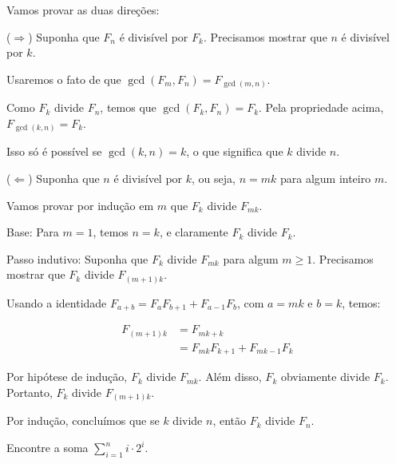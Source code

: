 \documentclass[12pt,a4paper]{article}
\begin{document}
\begin{tcolorbox}[colback=green!5!white,colframe=green!75!black,title=Resolução]
Vamos provar as duas direções:

($\Rightarrow$) Suponha que $F_n$ é divisível por $F_k$. Precisamos mostrar que $n$ é divisível por $k$.

Usaremos o fato de que $\gcd(F_m, F_n) = F_{\gcd(m,n)}$.

Como $F_k$ divide $F_n$, temos que $\gcd(F_k, F_n) = F_k$. Pela propriedade acima, $F_{\gcd(k,n)} = F_k$.

Isso só é possível se $\gcd(k,n) = k$, o que significa que $k$ divide $n$.

($\Leftarrow$) Suponha que $n$ é divisível por $k$, ou seja, $n = mk$ para algum inteiro $m$.

Vamos provar por indução em $m$ que $F_k$ divide $F_{mk}$.

Base: Para $m = 1$, temos $n = k$, e claramente $F_k$ divide $F_k$.

Passo indutivo: Suponha que $F_k$ divide $F_{mk}$ para algum $m \geq 1$. Precisamos mostrar que $F_k$ divide $F_{(m+1)k}$.

Usando a identidade $F_{a+b} = F_a F_{b+1} + F_{a-1} F_b$, com $a = mk$ e $b = k$, temos:

\begin{align}
F_{(m+1)k} &= F_{mk+k}\\
&= F_{mk} F_{k+1} + F_{mk-1} F_k
\end{align}

Por hipótese de indução, $F_k$ divide $F_{mk}$. Além disso, $F_k$ obviamente divide $F_k$. Portanto, $F_k$ divide $F_{(m+1)k}$.

Por indução, concluímos que se $k$ divide $n$, então $F_k$ divide $F_n$.
\end{tcolorbox}

\begin{tcolorbox}[colback=blue!5!white,colframe=blue!75!black,title=Exercício A3]
Encontre a soma $\sum_{i=1}^{n} i \cdot 2^i$.
\end{tcolorbox}
\end{document}
